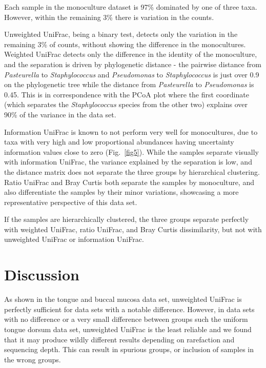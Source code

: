 \documentclass[10pt,letterpaper]{article}
\begin{document}
Each sample in the monoculture dataset is 97\% dominated by one of three taxa. However, within the remaining 3\% there is variation in the counts.

Unweighted UniFrac, being a binary test, detects only the variation in the remaining 3\% of counts, without showing the difference in the monocultures. Weighted UniFrac detects only the difference in the identity of the monoculture, and the separation is driven by phylogenetic distance - the pairwise distance from \textit{Pasteurella} to \textit{Staphylococcus} and \textit{Pseudomonas} to \textit{Staphylococcus} is just over 0.9 on the phylogenetic tree while the distance from \textit{Pasteurella} to \textit{Pseudomonas} is 0.45. This is in correspondence with the PCoA plot where the first coordinate (which separates the \textit{Staphylococcus} species from the other two) explains over 90\% of the variance in the data set.

Information UniFrac is known to not perform very well for monocultures, due to taxa with very high and low proportional abundances having uncertainty information values close to zero (Fig.~\ref{fig5}). While the samples separate visually with information UniFrac, the variance explained by the separation is low, and the distance matrix does not separate the three groups by hierarchical clustering. Ratio UniFrac and Bray Curtis both separate the samples by monoculture, and also differentiate the samples by their minor variations, showcasing a more representative perspective of this data set.

If the samples are hierarchically clustered, the three groups separate perfectly with weighted UniFrac, ratio UniFrac, and  Bray Curtis dissimilarity, but not with unweighted UniFrac or information UniFrac.

\FloatBarrier

\section*{Discussion}
As shown in the tongue and buccal mucosa data set, unweighted UniFrac is perfectly sufficient for data sets with a notable difference. However, in data sets with no difference or a very small difference between groups such the uniform tongue dorsum data set, unweighted UniFrac is the least reliable and we found that it may produce wildly different results depending on rarefaction and sequencing depth. This can result in spurious groups, or inclusion of samples in the wrong groups.
\end{document}
